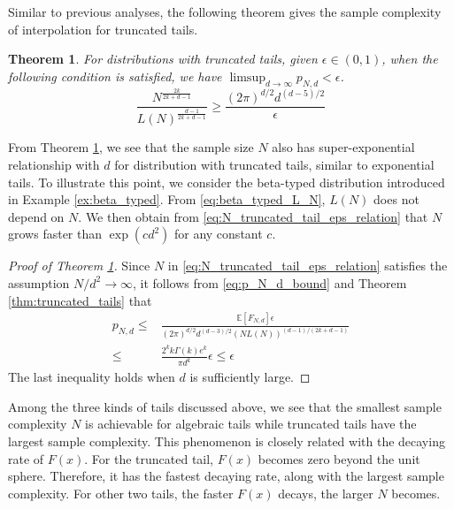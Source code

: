 \documentclass[conference,a4paper]{IEEEtran}
\def\E{\mathbb{E}}
\newtheorem{theorem}{Theorem}
\begin{document}
 Similar to previous analyses,
 the following theorem gives the sample complexity of interpolation for truncated tails.
 \begin{theorem}\label{thm:truncated_tails_sample}
  For distributions with truncated tails,
  given $\epsilon \in (0,1)$,
  when the following condition is satisfied,
  we have $ \limsup_{d\to \infty} p_{N,d} < \epsilon$.
  \begin{equation}\label{eq:N_truncated_tail_eps_relation}
    \frac{N^{\frac{2k}{2k+d-1}}}{L(N)^{\frac{d-1}{2k+d-1}}} 
         \geq \frac{(2\pi)^{d/2}d^{(d-5)/2}}{\epsilon}
  \end{equation}  
\end{theorem}
From Theorem \ref{thm:truncated_tails_sample}, we see that
the sample size $N$ also has super-exponential relationship
with $d$ for distribution with truncated tails, similar to
exponential tails.
To illustrate this point, we consider the beta-typed distribution introduced
in Example \ref{ex:beta_typed}.
From \eqref{eq:beta_typed_L_N}, $L(N)$ does not depend on $N$.
We then obtain from \eqref{eq:N_truncated_tail_eps_relation} that $N$ grows faster than $\exp(cd^2)$ for any constant $c$.
\begin{proof}[Proof of Theorem \ref{thm:truncated_tails_sample}]
     Since $N$ in \eqref{eq:N_truncated_tail_eps_relation} satisfies the assumption $N/d^2 \to \infty$,
     it follows from \eqref{eq:p_N_d_bound} and Theorem \ref{thm:truncated_tails} that
     \begin{align*}
     p_{N,d} \leq &\frac{\E[F_{N,d}]\epsilon}{(2\pi)^{d/2} d^{(d-3)/2} (NL(N))^{(d-1)/(2k+d-1)}}\\
     \leq & \frac{2^k k\Gamma(k)e^k}{\pi d^k} \epsilon \leq \epsilon
     \end{align*}
     The last inequality holds when $d$ is sufficiently large.
\end{proof}
Among the three kinds of tails discussed above, we see that the smallest sample complexity $N$
is achievable for algebraic tails while 
truncated tails have the largest sample complexity.
This phenomenon is closely related with the decaying rate of $F(x)$.
For the truncated tail, $F(x)$ becomes zero beyond the unit sphere. Therefore, it has the fastest decaying rate,
along with the largest sample complexity.
For other two tails, the faster $F(x)$ decays, the larger $N$ becomes.

\end{document}

